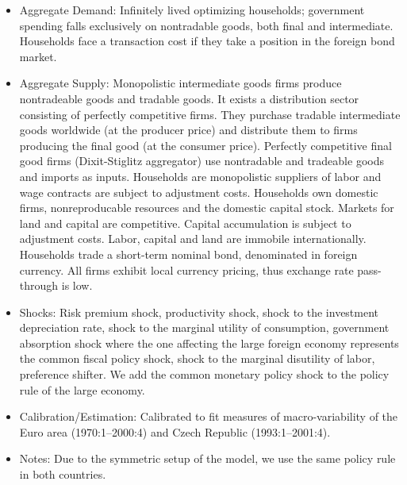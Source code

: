 \documentclass[11pt,a4paper]{article}
\begin{document}
	\begin{itemize}
		\item Aggregate Demand: Infinitely lived optimizing households; government spending falls exclusively on nontradable goods, both final and intermediate. Households face a transaction cost if they take a position in the foreign bond market.
		\item Aggregate Supply: Monopolistic intermediate goods firms produce nontradeable goods and tradable goods. It exists a distribution sector consisting of perfectly competitive firms. They purchase tradable intermediate goods worldwide (at the producer price) and distribute them to firms producing the final good (at the consumer price). Perfectly competitive final good firms (Dixit-Stiglitz aggregator) use nontradable and tradeable goods and imports as inputs. Households are monopolistic suppliers of labor and wage contracts are subject to adjustment costs. Households own domestic firms, nonreproducable resources and the domestic capital stock. Markets for land and capital are competitive. Capital accumulation is subject to adjustment costs. Labor, capital and land are immobile internationally. Households trade a short-term nominal bond, denominated in foreign currency. All firms exhibit local currency pricing, thus exchange rate pass-through is low.
		\item Shocks: Risk premium shock, productivity shock, shock to the investment depreciation rate, shock to the marginal utility of consumption, government absorption shock where the one affecting the large foreign economy represents the common fiscal policy shock, shock to the marginal disutility of labor, preference shifter. We add the common monetary policy shock to the policy rule of the large economy.
		\item Calibration/Estimation: Calibrated to fit measures of macro-variability of the Euro area (1970:1--2000:4) and Czech Republic (1993:1--2001:4).
		\item Notes: Due to the symmetric setup of the model, we use the same policy rule in both countries.
		
	\end{itemize}
	
\end{document}
